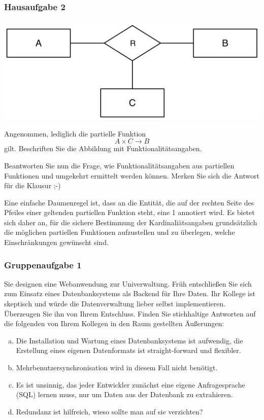 \begin{frame}
	\frametitle{Hausaufgabe 2}
	\vspace{0.5cm}

	\begin{multicols}{2}
		\begin{center}
			\includegraphics[height=.2\paperheight]{./img1.png}
		\end{center}
		Angenommen, lediglich die partielle Funktion
		\[ A \times C \rightarrow B \]
		gilt.
		Beschriften Sie die Abbildung mit Funktionalitätsangaben.

		Beantworten Sie nun die Frage, wie Funktionalitätsangaben aus partiellen
		Funktionen und umgekehrt ermittelt werden können.
		Merken Sie sich die Antwort für die Klausur ;-)

		\pause
		\vfill\columnbreak

		Eine einfache Daumenregel ist, dass an die Entität, die auf der rechten Seite des
		Pfeiles einer geltenden partiellen Funktion steht, eine 1 annotiert wird.
		Es bietet sich daher an, für die sichere Bestimmung der
		Kardinaliätsangaben grundsätzlich die möglichen partiellen Funktionen aufzustellen und
		zu überlegen, welche Einschränkungen gewünscht sind.
	\end{multicols}

\end{frame}

\begin{frame}
	\frametitle{Gruppenaufgabe 1}
	\vspace{0.5cm}

	Sie designen eine Webanwendung zur Univerwaltung.
	Früh entschließen Sie sich zum Einsatz eines Datenbanksystems als
	Backend für Ihre Daten.
	Ihr Kollege ist skeptisch und würde die Datenverwaltung lieber selbst implementieren.
	Überzeugen Sie ihn von Ihrem Entschluss.
	Finden Sie stichhaltige Antworten auf die folgenden von Ihrem Kollegen in den Raum
	gestellten Äußerungen:
	\begin{enumerate}[a)]
		\item Die Installation und Wartung eines Datenbanksystems ist aufwendig,
		      die Erstellung eines eigenen Datenformats ist straight-forward und flexibler.
		\item Mehrbenutzersynchronisation wird in diesem Fall nicht benötigt.
		\item Es ist unsinnig, das jeder Entwickler zunächst eine eigene Anfragesprache (SQL)
		      lernen muss, nur um Daten aus der Datenbank zu extrahieren.
		\item Redundanz ist hilfreich, wieso sollte man auf sie verzichten?
	\end{enumerate}
\end{frame}

